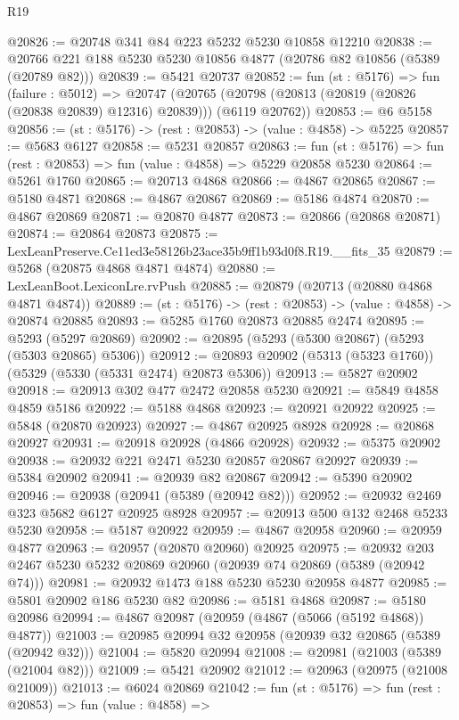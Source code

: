 \begin{lexlean}{R19}
\begin{coremodule}
@20826 := @20748 @341 @84 @223 @5232 @5230 @10858 @12210
@20838 := @20766 @221 @188 @5230 @5230 @10856 @4877 (@20786 @82 @10856 (@5389 (@20789 @82)))
@20839 := @5421 @20737
@20852 := fun (st : @5176) =>
  fun (failure : @5012) =>
  @20747 (@20765 (@20798 (@20813 (@20819 (@20826 (@20838 @20839) @12316) @20839))) (@6119 @20762))
@20853 := @6 @5158
@20856 := (st : @5176) -> (rest : @20853) -> (value : @4858) -> @5225
@20857 := @5683 @6127
@20858 := @5231 @20857
@20863 := fun (st : @5176) => fun (rest : @20853) => fun (value : @4858) => @5229 @20858 @5230
@20864 := @5261 @1760
@20865 := @20713 @4868
@20866 := @4867 @20865
@20867 := @5180 @4871
@20868 := @4867 @20867
@20869 := @5186 @4874
@20870 := @4867 @20869
@20871 := @20870 @4877
@20873 := @20866 (@20868 @20871)
@20874 := @20864 @20873
@20875 := LexLeanPreserve.Ce11ed3e58126b23ace35b9ff1b93d0f8.R19.__fits_35
@20879 := @5268 (@20875 @4868 @4871 @4874)
@20880 := LexLeanBoot.LexiconLre.rvPush
@20885 := @20879 (@20713 (@20880 @4868 @4871 @4874))
@20889 := (st : @5176) -> (rest : @20853) -> (value : @4858) -> @20874 @20885
@20893 := @5285 @1760 @20873 @20885 @2474
@20895 := @5293 (@5297 @20869)
@20902 := @20895 (@5293 (@5300 @20867) (@5293 (@5303 @20865) @5306))
@20912 := @20893 @20902 (@5313 (@5323 @1760)) (@5329 (@5330 (@5331 @2474) @20873 @5306))
@20913 := @5827 @20902
@20918 := @20913 @302 @477 @2472 @20858 @5230
@20921 := @5849 @4858 @4859 @5186
@20922 := @5188 @4868
@20923 := @20921 @20922
@20925 := @5848 (@20870 @20923)
@20927 := @4867 @20925 @8928
@20928 := @20868 @20927
@20931 := @20918 @20928 (@4866 @20928)
@20932 := @5375 @20902
@20938 := @20932 @221 @2471 @5230 @20857 @20867 @20927
@20939 := @5384 @20902
@20941 := @20939 @82 @20867
@20942 := @5390 @20902
@20946 := @20938 (@20941 (@5389 (@20942 @82)))
@20952 := @20932 @2469 @323 @5682 @6127 @20925 @8928
@20957 := @20913 @500 @132 @2468 @5233 @5230
@20958 := @5187 @20922
@20959 := @4867 @20958
@20960 := @20959 @4877
@20963 := @20957 (@20870 @20960) @20925
@20975 := @20932 @203 @2467 @5230 @5232 @20869 @20960 (@20939 @74 @20869 (@5389 (@20942 @74)))
@20981 := @20932 @1473 @188 @5230 @5230 @20958 @4877
@20985 := @5801 @20902 @186 @5230 @82
@20986 := @5181 @4868
@20987 := @5180 @20986
@20994 := @4867 @20987 (@20959 (@4867 (@5066 (@5192 @4868)) @4877))
@21003 := @20985 @20994 @32 @20958 (@20939 @32 @20865 (@5389 (@20942 @32)))
@21004 := @5820 @20994
@21008 := @20981 (@21003 (@5389 (@21004 @82)))
@21009 := @5421 @20902
@21012 := @20963 (@20975 (@21008 @21009))
@21013 := @6024 @20869
@21042 := fun (st : @5176) =>
  fun (rest : @20853) =>
  fun (value : @4858) =>

\end{coremodule}
\end{lexlean}
